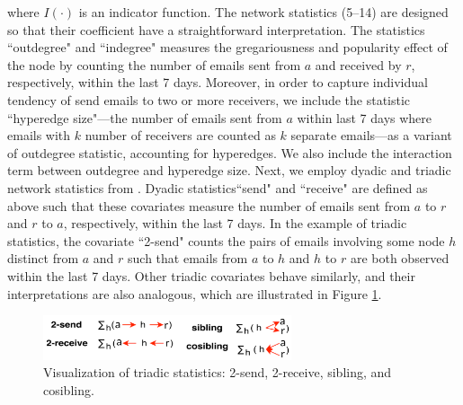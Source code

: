 \documentclass[ba]{imsart}
\numberwithin{equation}{section}
\theoremstyle{plain}
\begin{document}
 	   where $I(\cdot)$ is an indicator function. The network statistics (5--14) are designed so that their coefficient have a straightforward interpretation. The statistics ``outdegree" and ``indegree" measures the gregariousness and popularity effect of the node by counting the number of emails sent from $a$ and received by $r$, respectively, within the last 7 days. Moreover, in order to capture individual tendency of send emails to two or more receivers, we include the statistic ``hyperedge size"---the number of emails sent from $a$ within last 7 days where emails with $k$ number of receivers are counted as $k$ separate emails---as a variant of outdegree statistic, accounting for hyperedges. We also include the interaction term between outdegree and hyperedge size. Next, we employ dyadic and triadic network statistics from \cite{PerryWolfe2012}. Dyadic statistics``send" and ``receive" are defined as above such that these covariates measure the number of emails sent from $a$ to $r$ and $r$ to $a$, respectively, within the last 7 days. In the example of triadic statistics, the covariate ``2-send" counts the pairs of emails involving some node $h$ distinct from $a$ and $r$ such that emails from $a$ to $h$ and $h$ to $r$ are both observed within the last 7 days. Other triadic covariates behave similarly, and their interpretations are also analogous, which are illustrated in Figure \ref{figure:netstats}.
 	   \begin{figure}[!t]
 	   	\centering
 	   	\includegraphics[width=0.65\textwidth]{img/triad-1.png}	
 	   	\caption {Visualization of triadic statistics: 2-send, 2-receive, sibling, and cosibling.}
 	   	\label{figure:netstats}
 	   \end{figure}
 	   
\end{document}
